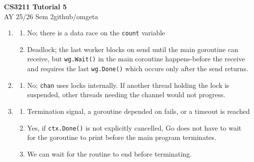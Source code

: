 \documentclass[12pt, a4paper]{article}
\newcommand{\mytitle}{CS3211 Tutorial 5}
\newcommand{\myauthor}{github/omgeta}
\newcommand{\mydate}{AY 25/26 Sem 2}
\begin{document}
\raggedright
\footnotesize
\begin{center}
{\normalsize{\textbf{\mytitle}}} \\
{\footnotesize{\mydate\hspace{2pt}\textemdash\hspace{2pt}\myauthor}}
\end{center}
\begin{enumerate}[Q\arabic*.]
  \item 
    \begin{enumerate}
      \item No; there is a data race on the \lstinline|count| variable

      \item Deadlock; the last worker blocks on send until the main goroutine can receive, but \lstinline|wg.Wait()| in the main coroutine happens-before the receive and requires the last \lstinline|wg.Done()| which occurs only after the send returns.
    \end{enumerate}

  \item 
    \begin{enumerate}
      \item No; \lstinline|chan| uses locks internally. If another thread holding the lock is suspended, other threads needing the channel would not progress.
    \end{enumerate}

  \item 
    \begin{enumerate}
      \item Termination signal, a goroutine depended on fails, or a timeout is reached

      \item Yes, if \lstinline|ctx.Done()| is not explicitly cancelled, Go does not have to wait for the goroutine to print before the main program terminates.

      \item We can wait for the routine to end before terminating.
    \end{enumerate}

\end{enumerate}
\end{document}
